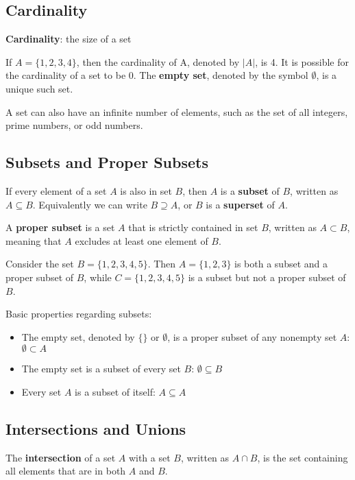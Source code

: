 \documentclass[12pt,a4paper]{article}
\begin{document}
\subsection*{Cardinality}
\textbf{Cardinality}: the size of a set

\bigbreak

If $A=\{1, 2, 3, 4\}$, then the cardinality of A, denoted by $\lvert A \rvert$, is 4. It is possible for the cardinality of a set to be 0. The \textbf{empty set}, denoted by the symbol $\emptyset$, is a unique such set.

\bigbreak

A set can also have an infinite number of elements, such as the set of all integers, prime numbers, or odd numbers.

\subsection*{Subsets and Proper Subsets}
If every element of a set $A$ is also in set $B$, then $A$ is a \textbf{subset} of $B$, written as $A\subseteq B$. Equivalently we can write $B\supseteq A$, or $B$ is a \textbf{superset} of $A$.

\bigbreak

A \textbf{proper subset} is a set $A$ that is strictly contained in set $B$, written as $A\subset B$, meaning that $A$ excludes at least one element of $B$.

\bigbreak

Consider the set $B=\{1, 2, 3, 4, 5\}$. Then $A=\{1, 2, 3\}$ is both a subset and a proper subset of $B$, while $C=\{1, 2, 3, 4, 5\}$ is a subset but not a proper subset of $B$.

\newpage

Basic properties regarding subsets:
\begin{itemize}
	\item The empty set, denoted by $\{\}$ or $\emptyset$, is a proper subset of any nonempty set $A$: $\emptyset \subset A$
	\item The empty set is a subset of every set $B$: $\emptyset \subseteq B$
	\item Every set $A$ is a subset of itself: $A \subseteq A$
\end{itemize}

\subsection*{Intersections and Unions}
The \textbf{intersection} of a set $A$ with a set $B$, written as $A\cap B$, is the set containing all elements that are in both $A$ and $B$.
\end{document}
